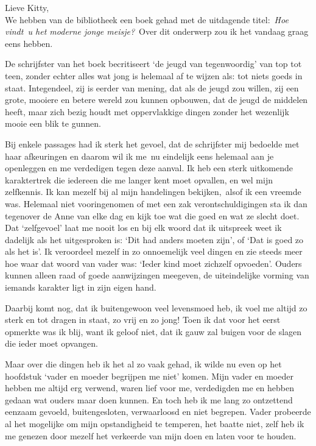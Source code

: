 \documentclass{book}
\begin{document}
Lieve Kitty,\\
We hebben van de bibliotheek een boek gehad met de uitdagende
titel:~\emph{Hoe vindt~u het moderne jonge meisje?}~Over dit onderwerp zou ik
het vandaag graag eens hebben.

De schrijfster van het boek becritiseert `de jeugd van tegenwoordig' van top tot
teen, zonder echter alles wat jong is helemaal af te wijzen als: tot niets goeds
in staat. Integendeel, zij is eerder van mening, dat als de jeugd zou willen,
zij een grote, mooiere en betere wereld zou kunnen opbouwen, dat de jeugd de
middelen heeft, maar zich bezig houdt met oppervlakkige dingen zonder het
wezenlijk mooie een blik te gunnen.

Bij enkele passages had ik sterk het gevoel, dat de schrijfster mij bedoelde met
haar afkeuringen en daarom wil ik me~nu eindelijk eens helemaal aan je
openleggen en me verdedigen tegen deze aanval. Ik heb een sterk uitkomende
karaktertrek die iedereen die me langer kent moet opvallen, en wel mijn
zelfkennis. Ik kan mezelf bij al mijn handelingen bekijken,~alsof ik een vreemde
was. Helemaal niet vooringenomen of met een zak verontschuldigingen sta ik dan
tegenover de Anne van elke dag en kijk toe wat die goed en wat ze slecht doet.
Dat `zelfgevoel' laat me nooit los en bij elk woord dat ik uitspreek weet ik
dadelijk als het uitgesproken is: `Dit had anders moeten zijn', of `Dat is goed
zo als het is'. Ik veroordeel mezelf in zo onnoemelijk veel dingen en zie steeds
meer hoe waar dat woord van vader was: `Ieder kind moet zichzelf opvoeden'.
Ouders kunnen alleen raad of goede aanwijzingen meegeven, de uiteindelijke
vorming van iemands karakter ligt in zijn eigen hand.

Daarbij komt nog, dat ik buitengewoon veel levensmoed heb, ik voel me altijd zo
sterk en tot dragen in staat, zo vrij en zo jong! Toen ik dat voor het eerst
opmerkte was ik blij, want ik geloof niet, dat ik gauw zal buigen voor de slagen
die ieder moet opvangen.

Maar over die dingen heb ik het al zo vaak gehad, ik wilde nu even op het
hoofdstuk `vader en moeder begrijpen me niet' komen. Mijn vader en moeder hebben
me altijd erg verwend, waren lief voor me, verdedigden me en hebben gedaan wat
ouders maar doen kunnen. En toch heb ik me lang zo ontzettend eenzaam gevoeld,
buitengesloten, verwaarloosd en niet begrepen. Vader probeerde al het mogelijke
om mijn opstandigheid te temperen, het baatte niet, zelf heb ik me genezen door
mezelf het verkeerde van mijn doen en laten voor te houden.
\end{document}
